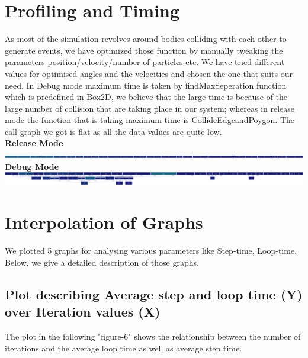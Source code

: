 \documentclass[12pt,a4paper]{report}
\begin{document}
\section*{Profiling and Timing}
As most of the simulation revolves around bodies colliding with each other to generate events, we have optimized those function by manually tweaking the parameters position/velocity/number of particles etc. We have tried different values for optimised angles and the velocities and chosen the one that suits our need. In Debug mode maximum time is taken by findMaxSeperation function which is predefined in Box2D, we believe that the large time is because of the large number of collision that are taking place in our system; whereas in release mode the function that is taking maximum time is CollideEdgeandPoygon.
\cite{profile}
The call graph we got is flat as all the data values are quite low. \\ \linebreak
\textbf{Release Mode} \\ \linebreak
\includegraphics[scale=0.04]{release_mode} \\ \linebreak
\textbf{Debug Mode} \\ \linebreak
\includegraphics[scale=0.045]{debug_mode}


\section*{Interpolation of Graphs}
\par We plotted 5 graphs for analysing various parameters like Step-time, Loop-time. Below, we give a detailed description of those graphs.
\subsection*{Plot describing Average step and loop time (Y) over Iteration values (X)}
\par The plot in the following "figure-6" shows the relationship between the number of iterations and the average loop time as well as average step time.
\end{document}
